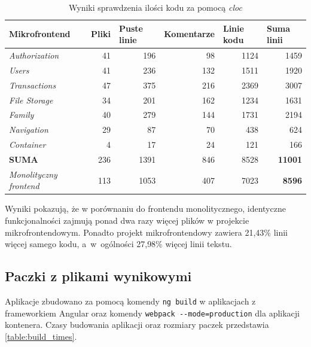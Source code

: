 \documentclass{SGGW-thesis}
\begin{document}
{    \begin{table}[h]
      \centering
      \caption{Wyniki sprawdzenia ilości kodu za pomocą \textit{cloc}}
      \begin{tabular}{|l||r|r|r|r|r|}
      \hline
      \textbf{Mikrofrontend} & \multicolumn{1}{l|}{\textbf{Pliki}} & \multicolumn{1}{l|}{\textbf{Puste linie}} & \multicolumn{1}{l|}{\textbf{Komentarze}} & \multicolumn{1}{l|}{\textbf{Linie kodu}} & \multicolumn{1}{l|}{\textbf{Suma linii}} \\ \hline
      \textit{Authorization} & 41 & 196 & 98 & 1124 & 1459 \\ \hline
      \textit{Users} & 41 & 236 & 132 & 1511 & 1920 \\ \hline
      \textit{Transactions} & 47 & 375 & 216 & 2369 & 3007 \\ \hline
      \textit{File Storage} & 34 & 201 & 162 & 1234 & 1631 \\ \hline
      \textit{Family} & 40 & 279 & 144 & 1731 & 2194 \\ \hline
      \textit{Navigation} & 29 & 87 & 70 & 438 & 624 \\ \hline
      \textit{Container} & 4 & 17 & 24 & 121 & 166 \\ \hline
      \textbf{SUMA}& 236 & 1391 & 846 & 8528 & \textbf{11001} \\ \hline\hline
      \textit{Monolityczny frontend} & 113 & 1053 & 407 & 7023 & \textbf{8596} \\ \hline
      \end{tabular}
      \label{table:cloc}
    \end{table}

    Wyniki pokazują, że w porównaniu do frontendu monolitycznego, identyczne funkcjonalności zajmują ponad dwa razy więcej plików w projekcie mikrofrontendowym. Ponadto projekt mikrofrontendowy zawiera 21,43\% linii więcej samego kodu, a~w~ogólności 27,98\% więcej linii tekstu.
  
    \subsection{Paczki z plikami wynikowymi}
    Aplikacje zbudowano za pomocą komendy \lstinline{ng build} w aplikacjach z frameworkiem Angular oraz komendy \lstinline{webpack --mode=production} dla aplikacji kontenera. Czasy budowania aplikacji oraz rozmiary paczek przedstawia \cref{table:build_times}.

}
\end{document}
